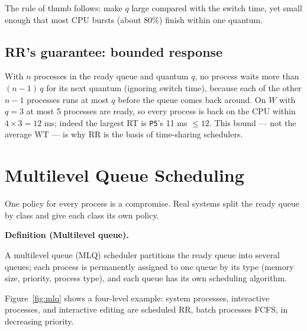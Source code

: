 \documentclass[11pt]{article}
\newenvironment{definitionbox}[1]{%
  \par\noindent\textbf{Definition (#1).}\ \itshape
}{\par\vspace{0.3em}}
\begin{document}
The rule of thumb follows: make $q$ large compared with the switch time, yet small enough that most CPU bursts (about 80\%) finish within one quantum.

\subsection*{RR's guarantee: bounded response}

With $n$ processes in the ready queue and quantum $q$, no process waits more than $(n-1)\,q$ for its next quantum (ignoring switch time), because each of the other $n-1$ processes runs at most $q$ before the queue comes back around. On $W$ with $q=3$ at most 5 processes are ready, so every process is back on the CPU within $4 \times 3 = 12$ ms; indeed the largest RT is \texttt{P5}'s 11 ms $\le 12$. This bound --- not the average WT --- is why RR is the basis of time-sharing schedulers.

\section{Multilevel Queue Scheduling}

\noindent{}

\medskip
One policy for every process is a compromise. Real systems split the ready queue by class and give each class its own policy.

\begin{definitionbox}{Multilevel queue}
A multilevel queue (MLQ) scheduler partitions the ready queue into several queues; each process is permanently assigned to one queue by its type (memory size, priority, process type), and each queue has its own scheduling algorithm.
\end{definitionbox}

Figure~\ref{fig:mlq} shows a four-level example: system processes, interactive processes, and interactive editing are scheduled RR, batch processes FCFS, in decreasing priority.
\end{document}
